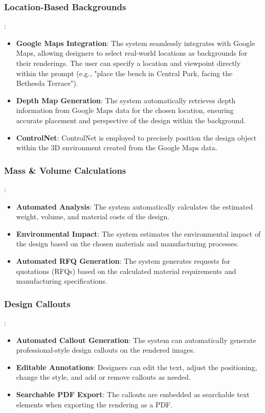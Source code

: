 \documentclass{article}
\begin{document}
\begin{itemize}
\subsubsection{Location-Based Backgrounds}:
\begin{itemize}
    \item \textbf{Google Maps Integration}: The system seamlessly integrates with Google Maps, allowing designers to select real-world locations as backgrounds for their renderings. The user can specify a location and viewpoint directly within the prompt (e.g., "place the bench in Central Park, facing the Bethesda Terrace").
    \item \textbf{Depth Map Generation}: The system automatically retrieves depth information from Google Maps data for the chosen location, ensuring accurate placement and perspective of the design within the background.
    \item \textbf{ControlNet}: ControlNet is employed to precisely position the design object within the 3D environment created from the Google Maps data.
\end{itemize}

\subsubsection{Mass \& Volume Calculations}:
\begin{itemize}
    \item \textbf{Automated Analysis}: The system automatically calculates the estimated weight, volume, and material costs of the design.
    \item \textbf{Environmental Impact}: The system estimates the environmental impact of the design based on the chosen materials and manufacturing processes.
    \item \textbf{Automated RFQ Generation}: The system generates requests for quotations (RFQs) based on the calculated material requirements and manufacturing specifications.
\end{itemize}

\subsubsection{Design Callouts}:
\begin{itemize}
    \item \textbf{Automated Callout Generation}: The system can automatically generate professional-style design callouts on the rendered images.
    \item \textbf{Editable Annotations}: Designers can edit the text, adjust the positioning, change the style, and add or remove callouts as needed.
    \item \textbf{Searchable PDF Export}: The callouts are embedded as searchable text elements when exporting the rendering as a PDF.
\end{itemize}


\end{itemize}
\end{document}
